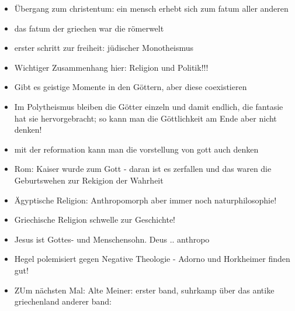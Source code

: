 \documentclass[emulatestandardclasses]{scrartcl}
\begin{document}
\begin{itemize}
  \item Übergang zum christentum: ein mensch erhebt sich zum fatum aller anderen
  \item das fatum der griechen war die römerwelt
  \item erster schritt zur freiheit: jüdischer Monotheismus
  \item Wichtiger Zusammenhang hier: Religion und Politik!!!
  \item Gibt es geistige Momente in den Göttern, aber diese coexistieren
  \item Im Polytheismus bleiben die Götter einzeln und damit endlich, die fantasie hat sie hervorgebracht; so kann man die Göttlichkeit am Ende aber nicht denken!
  \item mit der reformation kann man die vorstellung von gott auch denken
  \item Rom: Kaiser wurde zum Gott - daran ist es zerfallen und das waren die Geburtswehen zur Rekigion der Wahrheit
  \item Ägyptische Religion: Anthropomorph aber immer noch naturphilosophie!
  \item Griechische Religion schwelle zur Geschichte!
  \item Jesus ist Gottes- und Menschensohn. Deus .. anthropo
  \item Hegel polemisiert gegen Negative Theologie - Adorno und Horkheimer finden gut!
  \item ZUm nächsten Mal: Alte Meiner: erster band, suhrkamp über das antike griechenland anderer band: 
\end{itemize}
\end{document}
